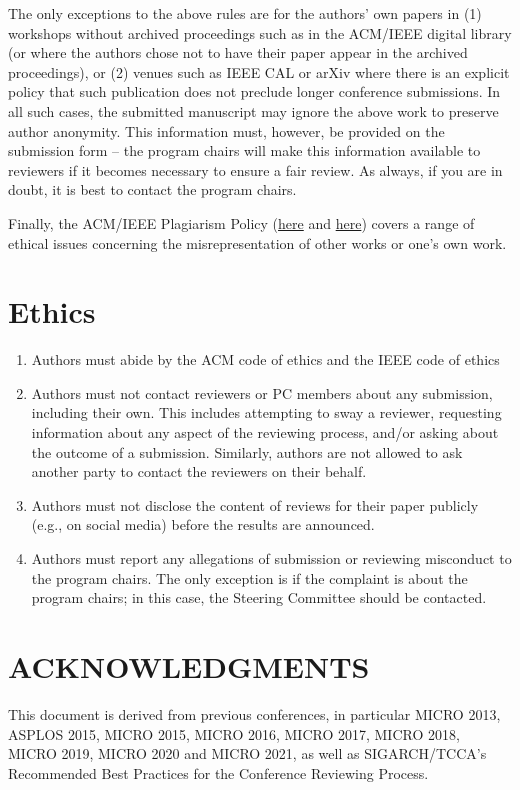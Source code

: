 \documentclass{sig-alternate}
\begin{document}
{The only exceptions to the above rules are for the authors' own papers in (1) workshops without archived proceedings such as in the ACM/IEEE digital library (or where the authors chose not to have their paper appear in the archived proceedings), or (2) venues such as IEEE CAL or arXiv where there is an explicit policy that such publication does not preclude longer conference submissions.  In all such cases, the submitted manuscript may ignore the above work to preserve author anonymity. This information must, however, be provided on the submission form -- the program chairs will make this information available to reviewers if it becomes necessary to ensure a fair review.  As always, if you are in doubt, it is best to contact the program chairs.


Finally, the ACM/IEEE Plagiarism Policy (\href{http://www.acm.org/publications/policies/plagiarism_policy}{here} and \href{https://www.ieee.org/publications_standards/publications/rights/plagiarism.html}{here}) covers a range of ethical issues concerning the misrepresentation of other works or one's own work.


\section{Ethics}

\begin{enumerate}
\item Authors must abide by the ACM code of ethics and the IEEE code of ethics
\item Authors must not contact reviewers or PC members about any submission, including their own. This includes attempting to sway a reviewer, requesting information about any aspect of the reviewing process, and/or asking about the outcome of a submission. Similarly, authors are not allowed to ask another party to contact the reviewers on their behalf.
\item Authors must not disclose the content of reviews for their paper publicly (e.g., on social media)  before the results are announced. 
\item Authors must report any allegations of submission or reviewing misconduct to the program chairs. The only exception is if the complaint is about the program chairs; in this case, the Steering Committee should be contacted. 
\end{enumerate}


\section*{ACKNOWLEDGMENTS}
This document is derived from previous conferences, in particular MICRO 2013, ASPLOS 2015, MICRO 2015, MICRO 2016, MICRO 2017, MICRO
2018, MICRO 2019, MICRO 2020 and MICRO 2021, as well as SIGARCH/TCCA's Recommended Best Practices for the Conference Reviewing Process.
}



% 
% 
\end{document}
